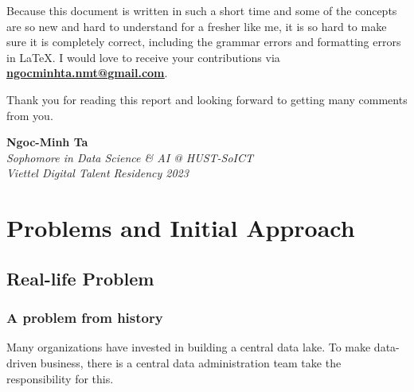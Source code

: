 \documentclass[12pt, a4paper]{book}
\begin{document}
Because this document is written in such a short time and some of the concepts are so new and hard to understand for a fresher like me, it is so hard to make sure it is completely correct, including the grammar errors and formatting errors in \LaTeX. I would love to receive your contributions via \underline{\textbf{\href{mailto:ngocminhta.nmt@gmail.com}{ngocminhta.nmt@gmail.com}}}.

Thank you for reading this report and looking forward to getting many comments from you.\\
\vspace{0.5cm}

\raggedleft
\textbf{Ngoc-Minh Ta}\\
\textit{Sophomore in Data Science \& AI @ HUST-SoICT} \\
\textit{Viettel Digital Talent Residency 2023}

\justifying
{}

        \tableofcontents
        
        \listoffigures
        
        \let\cleardoublepage\clearpage
        
        \listoftables
        
        
        \let\cleardoublepage\clearpage
    \endgroup
    
    \begingroup
        \frontmatter
        \justifying
        \let\cleardoublepage\clearpage
    \endgroup
    
    \mainmatter
    \justifying
    \normalsize
\chapter{Problems and Initial Approach}

\section{Real-life Problem}
\subsection{A problem from history}
Many organizations have invested in building a central data lake. To make data-driven business, there is a central data administration team take the responsibility for this.
\end{document}
